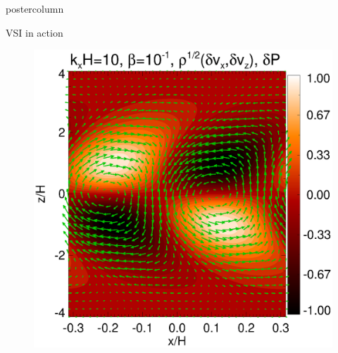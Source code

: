 \documentclass[final,hyperref={pdfpagelabels=false}]{beamer}
\newlength{\columnheight}
\begin{document}
\begin{frame}
\begin{columns}
    \begin{column}{.49\textwidth}
      \begin{beamercolorbox}[center,wd=\textwidth]{postercolumn}
        \begin{minipage}[T]{.95\textwidth} %
          \parbox[t][\columnheight]{\textwidth}{
            \begin{block}{{\Large VSI in action}}
              \justifying
              \begin{figure}
                \includegraphics[width=\linewidth]{figures/result2d_cool}
              \end{figure}
              \end{block}
               
}
\end{minipage}
\end{beamercolorbox}
\end{column}
\end{columns}
\end{frame}
\end{document}
